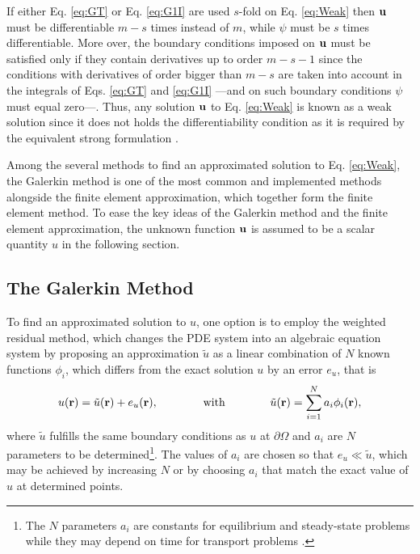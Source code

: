 %
If either Eq. \eqref{eq:GT} or Eq. \eqref{eq:G1I} are used $s$-fold on Eq. \eqref{eq:Weak} then $\vb{u}$ must be differentiable $m-s$ times instead of $m$, while $\psi$ must be $s$ times differentiable. More over, the boundary conditions imposed on $\vb{u}$ must be satisfied only if they contain  derivatives up to order $m-s-1$ since the conditions with derivatives of order bigger than $m-s$ are taken into account in the integrals of Eqs. \eqref{eq:GT} and \eqref{eq:G1I} ---and on such boundary conditions $\psi$ must equal zero---. Thus, any solution $\vb{u}$ to Eq. \eqref{eq:Weak} is known as a weak solution  since it does not holds the differentiability condition as it is required by the equivalent strong formulation \cite{dhatt_finite_2012}.

Among the several methods to find an approximated solution to Eq. \eqref{eq:Weak}, the Galerkin method is one of the most common and implemented methods alongside the finite element approximation, which together form the finite element method. To ease the key ideas of the Galerkin method and the finite element approximation, the unknown function $\vb{u}$ is assumed to be a scalar quantity $u$ in the following section.

    \subsection{The Galerkin Method}

    To find an approximated solution to $u$, one option is to employ the weighted residual method, which changes the PDE system into an algebraic equation system by proposing an approximation  $\tilde{u}$ as a linear combination of $N$ known functions  $\phi_i$, which differs from the exact solution $u$ by an error $e_{u}$, that is \cite{dhatt_finite_2012,larson_finite_2013,fletcher_computational_1984}
     \begin{align}
        {u}(\vb{r}) = \tilde{{u}}(\vb{r}) + e_{{u}}(\vb{r}),
            \qquad\qquad
            \text{with}
            \qquad\qquad
        \tilde{{u}}(\vb{r}) = \sum_{i = 1}^{N} {a}_i\phi_i(\vb{r}),
     \label{eq:uapprox}
     \end{align}
     where $\tilde{{u}}$ fulfills the same boundary conditions as ${u}$ at $\partial\Omega$ and ${a}_i$ are $N$ parameters to be determined\footnote{The $N$ parameters ${a}_i$ are constants for equilibrium and steady-state problems while they may depend on time for transport problems \cite{dhatt_finite_2012}.}. The values of ${a}_i$ are chosen so that $e_{{u}}\ll  \tilde{u} $, which may be achieved by increasing $N$ or by choosing ${a}_i$ that match the exact value of ${u}$ at determined points.

